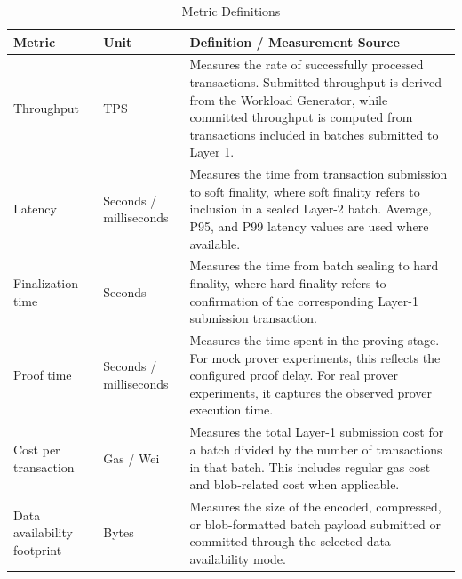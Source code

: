 \begin{table}[!htbp]
\centering
\caption{Metric Definitions}
\label{tab:metric_definitions}
\small
\setlength{\tabcolsep}{4pt}
\renewcommand{\arraystretch}{1.15}
\begin{tabularx}{\textwidth}{@{}p{}p{}X@{}}
\toprule
\textbf{Metric} & \textbf{Unit} & \textbf{Definition / Measurement Source} \\
\midrule

Throughput
& TPS
& Measures the rate of successfully processed transactions. Submitted throughput is derived from the Workload Generator, while committed throughput is computed from transactions included in batches submitted to Layer 1. \\

\addlinespace

Latency
& Seconds / milliseconds
& Measures the time from transaction submission to soft finality, where soft finality refers to inclusion in a sealed Layer-2 batch. Average, P95, and P99 latency values are used where available. \\

\addlinespace

Finalization time
& Seconds
& Measures the time from batch sealing to hard finality, where hard finality refers to confirmation of the corresponding Layer-1 submission transaction. \\

\addlinespace

Proof time
& Seconds / milliseconds
& Measures the time spent in the proving stage. For mock prover experiments, this reflects the configured proof delay. For real prover experiments, it captures the observed prover execution time. \\

\addlinespace

Cost per transaction
& Gas / Wei
& Measures the total Layer-1 submission cost for a batch divided by the number of transactions in that batch. This includes regular gas cost and blob-related cost when applicable. \\

\addlinespace

Data availability footprint
& Bytes
& Measures the size of the encoded, compressed, or blob-formatted batch payload submitted or committed through the selected data availability mode. \\

\bottomrule
\end{tabularx}
\normalsize
\end{table}


